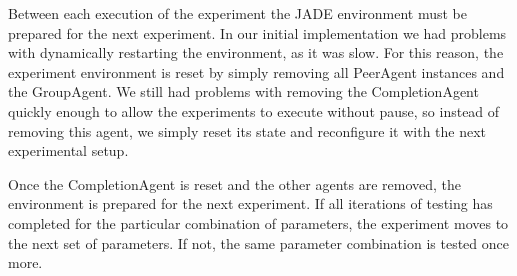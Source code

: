 Between each execution of the experiment the JADE environment must be prepared for the next experiment. In our initial implementation we had problems with dynamically restarting the environment, as it was slow. For this reason, the experiment environment is reset by simply removing all PeerAgent instances and the GroupAgent. We still had problems with removing the CompletionAgent quickly enough to allow the experiments to execute without pause, so instead of removing this agent, we simply reset its state and reconfigure it with the next experimental setup.

Once the CompletionAgent is reset and the other agents are removed, the environment is prepared for the next experiment. If all iterations of testing has completed for the particular combination of parameters, the experiment moves to the next set of parameters. If not, the same parameter combination is tested once more.